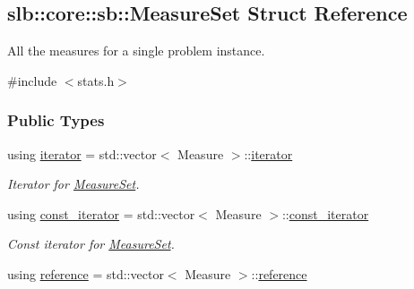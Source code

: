 \hypertarget{structslb_1_1core_1_1sb_1_1MeasureSet}{}\subsection{slb\+:\+:core\+:\+:sb\+:\+:Measure\+Set Struct Reference}
\label{structslb_1_1core_1_1sb_1_1MeasureSet}


All the measures for a single problem instance.  




{\ttfamily \#include $<$stats.\+h$>$}

\subsubsection*{Public Types}
\begin{DoxyCompactItemize}
\item 
using \hyperlink{structslb_1_1core_1_1sb_1_1MeasureSet_a7e1ad3e450df31415c6282ae4ccc325f}{iterator} = std\+::vector$<$ Measure $>$\+::\hyperlink{structslb_1_1core_1_1sb_1_1MeasureSet_a7e1ad3e450df31415c6282ae4ccc325f}{iterator}\hypertarget{structslb_1_1core_1_1sb_1_1MeasureSet_a7e1ad3e450df31415c6282ae4ccc325f}{}\label{structslb_1_1core_1_1sb_1_1MeasureSet_a7e1ad3e450df31415c6282ae4ccc325f}

\begin{DoxyCompactList}\small\item\em Iterator for \hyperlink{structslb_1_1core_1_1sb_1_1MeasureSet}{Measure\+Set}. \end{DoxyCompactList}\item 
using \hyperlink{structslb_1_1core_1_1sb_1_1MeasureSet_ab17d3dd6131a9604c958cd059a661db0}{const\+\_\+iterator} = std\+::vector$<$ Measure $>$\+::\hyperlink{structslb_1_1core_1_1sb_1_1MeasureSet_ab17d3dd6131a9604c958cd059a661db0}{const\+\_\+iterator}\hypertarget{structslb_1_1core_1_1sb_1_1MeasureSet_ab17d3dd6131a9604c958cd059a661db0}{}\label{structslb_1_1core_1_1sb_1_1MeasureSet_ab17d3dd6131a9604c958cd059a661db0}

\begin{DoxyCompactList}\small\item\em Const iterator for \hyperlink{structslb_1_1core_1_1sb_1_1MeasureSet}{Measure\+Set}. \end{DoxyCompactList}\item 
using \hyperlink{structslb_1_1core_1_1sb_1_1MeasureSet_a0e009aab0fa7d59c7a9e5cab19897abe}{reference} = std\+::vector$<$ Measure $>$\+::\hyperlink{structslb_1_1core_1_1sb_1_1MeasureSet_a0e009aab0fa7d59c7a9e5cab19897abe}{reference}\hypertarget{structslb_1_1core_1_1sb_1_1MeasureSet_a0e009aab0fa7d59c7a9e5cab19897abe}{}\label{structslb_1_1core_1_1sb_1_1MeasureSet_a0e009aab0fa7d59c7a9e5cab19897abe}


\end{DoxyCompactItemize}
